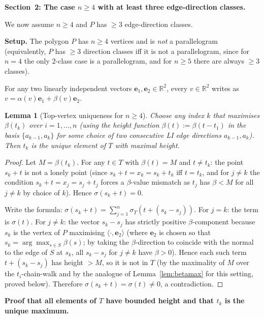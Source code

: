 \documentclass{article}
\newtheorem{lemma}{Lemma}
\begin{document}
\medskip
\noindent\textbf{Section~2: The case $n\ge 4$ with at least three edge-direction classes.}

We now assume $n\ge 4$ and $P$ has $\ge 3$ edge-direction classes.

\medskip
\noindent\textbf{Setup.}
The polygon $P$ has $n\ge 4$ vertices and is \emph{not} a parallelogram
(equivalently, $P$ has $\ge 3$ direction classes iff it is not a parallelogram, since
for $n=4$ the only $2$-class case is a parallelogram, and for $n\ge 5$ there are always
$\ge 3$ classes).

For any two linearly independent vectors $\mathbf{e}_1,\mathbf{e}_2\in\mathbb{R}^2$,
every $v\in\mathbb{R}^2$ writes as $v=\alpha(v)\mathbf{e}_1+\beta(v)\mathbf{e}_2$.

\begin{lemma}[Top-vertex uniqueness for $n\ge 4$]\label{lem:topunique}
Choose any index $k$ that maximises $\beta(t_k)$ over $i=1,\dots,n$
(using the height function $\beta(t):=\beta(t-t_1)$ in the basis $\{a_{k-1},a_k\}$
for some choice of two consecutive LI edge directions $a_{k-1},a_k$).
Then $t_k$ is the \emph{unique} element of $T$ with maximal height.
\end{lemma}
\begin{proof}
Let $M=\beta(t_k)$.  For any $t\in T$ with $\beta(t)=M$ and $t\ne t_k$:
the point $s_k+t$ is not a lonely point (since $s_k+t=x_k=s_k+t_k$ iff $t=t_k$, and
for $j\ne k$ the condition $s_k+t=x_j=s_j+t_j$ forces a $\beta$-value mismatch as
$t_j$ has $\beta<M$ for all $j\ne k$ by choice of $k$).
Hence $\sigma(s_k+t)=0$.

Write the formula:
$\sigma(s_k+t)=\sum_{j=1}^n\sigma_T(t+(s_k-s_j))$.
For $j=k$: the term is $\sigma(t)$.
For $j\ne k$: the vector $s_k-s_j$ has strictly positive $\beta$-component because $s_k$ is the
vertex of $P$ maximising $\langle\cdot,\mathbf{e}_2\rangle$ (where $\mathbf{e}_2$ is
chosen so that $s_k=\arg\max_{s\in S}\beta(s)$; by taking the $\beta$-direction to coincide
with the normal to the edge of $S$ at $s_k$, all $s_k-s_j$ for $j\ne k$ have
$\beta>0$). Hence each such term $t+(s_k-s_j)$ has height $>M$, so it
is not in $T$ (by the maximality of $M$ over the $t_i$-chain-walk and by the
analogue of Lemma~\ref{lem:betamax} for this setting, proved below).
Therefore $\sigma(s_k+t)=\sigma(t)\ne 0$, a contradiction.
\end{proof}

\medskip
\noindent\textbf{Proof that all elements of $T$ have bounded height and that $t_k$ is the unique maximum.}
\end{document}
